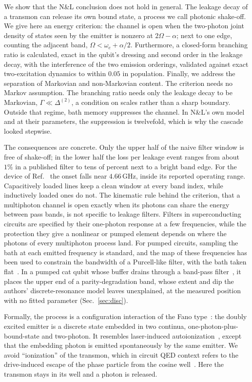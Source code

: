 \documentclass[aps,prresearch,twocolumn,superscriptaddress,nofootinbib,longbibliography,floatfix]{revtex4-2}
\begin{document}
We show that the N\&L conclusion does not hold in general. The leakage decay of a transmon can release its own bound
state, a process we call photonic shake-off. We give here an energy criterion: the channel is open when the two-photon joint density of states seen by the emitter is
nonzero at $2\Omega-\alpha$; next to one edge, counting the adjacent band, $\Omega<\omega_e+\alpha/2$. Furthermore, a closed-form branching ratio is calculated, exact in the qubit's dressing and second order in the leakage decay, with the
interference of the two emission orderings, validated against exact two-excitation dynamics to within $0.05$ in
population. Finally, we address the separation of Markovian and non-Markovian content. The criterion needs no Markov assumption. The branching
ratio needs only the leakage decay to be Markovian, $\Gamma\ll\Delta^{(2)}$, a condition on scales rather than a sharp
boundary. Outside that regime, bath memory suppresses the channel. In
N\&L's own model and at their parameters, the suppression is twelvefold, which is why the cascade looked stepwise.

The consequences are concrete. Only the upper half of the naive filter window is free of shake-off; in the lower half
the loss per leakage event ranges from about $1\%$ in a published filter to tens of percent next to a bright band edge.
For the device of Ref.~\cite{Thorbeck2024} the onset falls near $4.66$\,GHz, inside its reported operating range.
Capacitively loaded lines keep a clean window at every band index, while inductively loaded ones do not. The
kinematic rule behind the criterion, that a multiphoton channel is open exactly when its photons can share the energy
between pass bands, is not specific to leakage filters. Filters in superconducting circuits are specified by their
one-photon response at a few frequencies, while the protection they give a nonlinear or pumped element depends on where
the photons of every multiphoton process land. For pumped circuits, sampling the bath at each emitted frequency is
standard, and the map of these frequencies has been used to constrain the bandwidth of a Purcell-like filter, with the bath
taken flat~\cite{Carde2024}. In a pumped cat qubit whose buffer drains through a band-pass
filter~\cite{Putterman2025}, it places the upper end of a parity-degradation band, whose extent and dip the authors'
discrete-resonance model leaves unexplained, at the measured position with no fitted parameter (Sec.~\ref{sec:disc}).

Formally, the process is a configuration interaction of the Fano type~\cite{Fano1961}: the doubly excited emitter is a
discrete state embedded in two continua, one-photon-plus-bound-state and two-photon. It resembles laser-induced
autoionization~\cite{RzazewskiEberly1981,LambropoulosZoller1981,KnightLauderDalton1990}, except that the embedding
photon is emitted spontaneously by the same emitter. We avoid ``ionization'' of the transmon, which in circuit QED context
refers to the drive-induced escape of the phase particle from the cosine
well~\cite{Shillito2022,Cohen2023,Dumas2024}. Here the transmon stays in its well and a photon is released.
\end{document}
